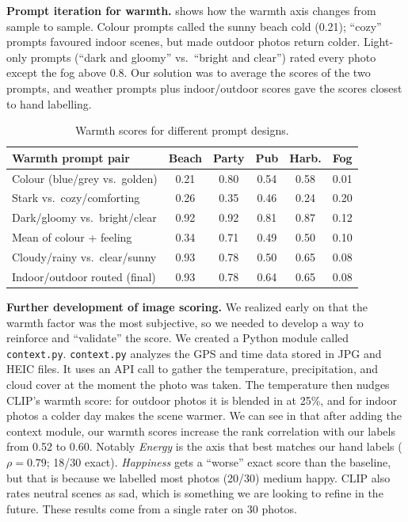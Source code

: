 \documentclass{article}
\begin{document}
\textbf{Prompt iteration for warmth.}  shows how the
warmth axis changes from sample to sample. Colour prompts called the sunny beach cold (0.21);
``cozy'' prompts favoured indoor scenes, but made outdoor photos return colder.
Light-only prompts (``dark and gloomy'' vs.\ ``bright and clear'') rated every
photo except the fog above 0.8. Our solution was to average the scores of the two prompts, and
weather prompts plus indoor/outdoor scores gave the scores closest to hand labelling.

\begin{table}[!htb]
  \centering\footnotesize
  \setlength{\tabcolsep}{3pt}
  \begin{tabular}{@{}lccccc@{}}
  \toprule
  Warmth prompt pair & Beach & Party & Pub & Harb. & Fog \\
  \midrule
  Colour (blue/grey vs.\ golden) & 0.21 & 0.80 & 0.54 & 0.58 & 0.01 \\
  Stark vs.\ cozy/comforting     & 0.26 & 0.35 & 0.46 & 0.24 & 0.20 \\
  Dark/gloomy vs.\ bright/clear  & 0.92 & 0.92 & 0.81 & 0.87 & 0.12 \\
  Mean of colour + feeling       & 0.34 & 0.71 & 0.49 & 0.50 & 0.10 \\
  Cloudy/rainy vs.\ clear/sunny  & 0.93 & 0.78 & 0.50 & 0.65 & 0.08 \\
  Indoor/outdoor routed (final) & 0.93 & 0.78 & 0.64 & 0.65 & 0.08 \\
  \bottomrule
  \end{tabular}
  \caption{Warmth scores for different prompt designs.}
  \label{tab:warmth}
  \end{table}

  \textbf{Further development of image scoring.}
  We realized early on that the warmth factor was the most subjective, so we needed
  to develop a way to reinforce and ``validate'' the score. We created a Python module called
  \texttt{context.py}. \texttt{context.py} analyzes the GPS and time data stored in JPG and HEIC files.
  It uses an API call to gather the temperature, precipitation, and cloud cover at the moment the photo
  was taken. The temperature then nudges CLIP's warmth score: for outdoor photos it is blended in at 25\%,
  and for indoor photos a colder day makes the scene warmer. We can see in  that after adding
  the context module, our warmth scores increase the rank correlation with our labels from 0.52 to 0.60.
  Notably \emph{Energy} is the axis that best matches our hand labels ($\rho = 0.79$; 18/30 exact).
  \emph{Happiness} gets a ``worse'' exact score than the baseline, but that is because we labelled most
  photos (20/30) medium happy. CLIP also rates neutral scenes as sad, which is something we are looking
  to refine in the future. These results come from a single rater on 30 photos.
\end{document}
